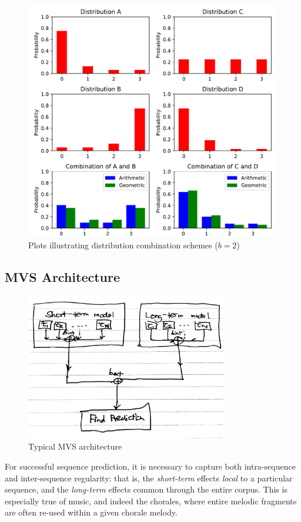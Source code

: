 \documentclass[12pt,a4paper,twoside,openright]{report}
\begin{document}
\begin{figure}[H]
\centering
\includegraphics[width=400pt]{figs/dist_comb.pdf}
\caption{Plots illustrating distribution combination schemes ($b = 2$)}
\label{fig:dist-comb-plot}
\end{figure}

\subsection{MVS Architecture}\label{sec:mvs-arch}

\begin{figure}[H]
\centering
\includegraphics[width=250pt]{figs/mvs_arch_tmp.jpg}
\caption{Typical MVS architecture}
\label{fig:mvs-arch}
\end{figure}

For successful sequence prediction, it is necessary to capture both
intra-sequence and inter-sequence regularity: that is, the \emph{short-term}
effects \emph{local} to a particular sequence, and the \emph{long-term} effects
common through the entire corpus.  This is especially true of music, and indeed
the chorales, where entire melodic fragments are often re-used within a given
chorale melody.
\end{document}
